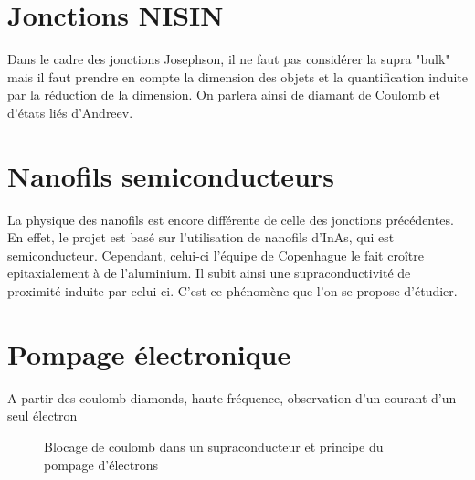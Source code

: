         \section{Jonctions NISIN}
        Dans le cadre des jonctions Josephson, il ne faut pas considérer la supra "bulk" mais il faut prendre en compte la dimension des objets et la quantification induite par la réduction de la dimension. On parlera ainsi de diamant de Coulomb et d'états liés d'Andreev. \cite{NIS_thermo}
        
        \section{Nanofils semiconducteurs}
        La physique des nanofils est encore différente de celle des jonctions précédentes. En effet, le projet est basé sur l'utilisation de nanofils d'InAs, qui est semiconducteur. Cependant, celui-ci l'équipe de Copenhague le fait croître epitaxialement à de l'aluminium. Il subit ainsi une supraconductivité de proximité induite par celui-ci. C'est ce phénomène que l'on se propose d'étudier.
        
        \section{Pompage électronique}
            A partir des coulomb diamonds, haute fréquence, observation d'un courant d'un seul électron
            \begin{figure}
                \centering
                
            \caption{Blocage de coulomb dans un supraconducteur et principe du pompage d'électrons}
            \end{figure}
            
